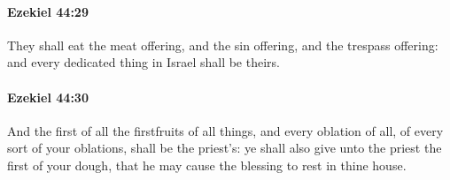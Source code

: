 		\paragraph{Ezekiel 44:29} %
			\label{EZEKIEL-44-29}

			They shall eat the meat offering, and the sin offering, and the trespass offering: and every dedicated thing in Israel shall be theirs.


		\paragraph{Ezekiel 44:30} %
			\label{EZEKIEL-44-30}

			And the first of all the firstfruits of all things, and every oblation of all, of every sort of your oblations, shall be the priest’s: ye shall also give unto the priest the first of your dough, that he may cause the blessing to rest in thine house.

